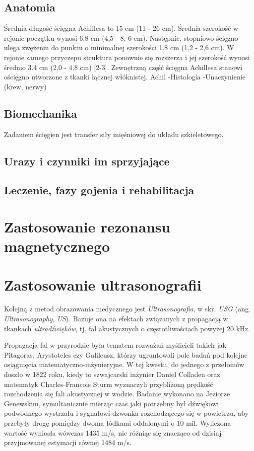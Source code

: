 \subsection{Anatomia}
Średnia długość ścięgna Achillesa to 15 cm (11 - 26 cm). Średnia szerokość w rejonie początku wynosi 6.8 cm (4,5 - 8, 6 cm). Następnie, stopniowo ścięgno ulega zwężeniu do punktu o minimalnej szerokości 1.8 cm (1,2 - 2,6 cm). W rejonie samego przyczepu struktura ponownie się rozszerza i jej szerokość wynosi średnio 3.4 cm (2,0 - 4,8 cm) [2-3].
Zewnętrzną część ścięgna Achillesa stanowi ościęgno utworzone z tkanki łącznej włóknistej.
Achil
-Histologia
-Unaczynienie (krew, nerwy)

\subsection{Biomechanika}
Zadaniem ścięgien jest transfer siły mięśniowej do układu szkieletowego.
\subsection{Urazy i czynniki im sprzyjające}
\subsection{Leczenie, fazy gojenia i rehabilitacja}
\section{Zastosowanie rezonansu magnetycznego}
\section{Zastosowanie ultrasonografii}

Kolejną z metod obrazowania medycznego jest \textit{Ultrasonografia}, w skr. \textit{USG} (ang. \textit{Ultrasonography}, \textit{US}). Bazuje ona na efektach związanych z propagacją w tkankach \textit{ultradźwięków}, tj. fal akustycznych o częstotliwościach powyżej 20 kHz.

Propagacja fal w przyrodzie była tematem rozważań myślicieli takich jak Pitagoras, Arystoteles czy Galileusz, którzy ugruntowali pole badań pod kolejne osiągnięcia matematyczno-inżynieryjne. W tej kwestii, do jednego z przełomów doszło w 1822 roku, kiedy to szwajcarski inżynier Daniel Colladen oraz matematyk Charles-Francois Sturm wyznaczyli przybliżoną prędkość rozchodzenia się fali akustycznej w wodzie. Badanie wykonano na Jeziorze Genewskim, symultanicznie mierząc czas jaki potrzebny był dźwiękowi podwodnego wystrzału i sygnałowi dzwonka rozchodzącego się w powietrzu, aby przebyły drogę pomiędzy dwoma łódkami oddalonymi o 10 mil. Wyliczona wartość wyniosła wówczas 1435 m/s, nie różniąc się znacząco od dzisiaj przyjmowanej estymacji równej 1484 m/s. 

